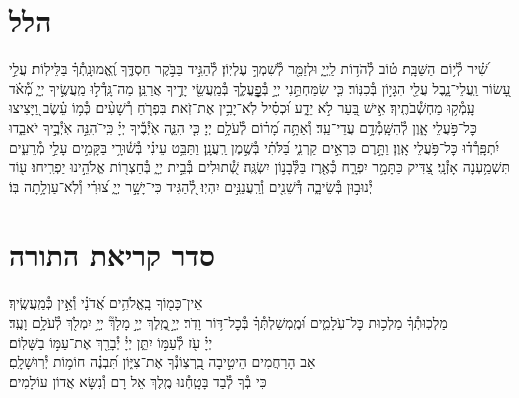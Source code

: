 \documentclass[twoside, openany, parskip=half, 11pt]{book}
\begin{document}
\label{hallel}
\section[הלל‎]{ הלל‎ }
\hallel{\shatz}


\vfill

\fullkaddish

\weekdayshir
\label{shirshabbat}

שִׁ֝֗יר לְ֯י֥וֹם הַשַּׁבָּֽת׃
ט֗וֹב לְ֯הֹד֥וֹת לַֽיְיָ֑ וּלְזַמֵּ֖ר לְ֯שִׁמְךָ֣ עֶלְיֽוֹן׃
לְ֯הַגִּ֣יד בַּבֹּ֣קֶר חַסְדֶּ֑ךָ וֶֽ֝אֱמוּנָֽתְ֯ךָ֗ בַּלֵּילֽוֹת׃
עֲלֵ֣י עָ֭שׂוֹר וַֽעֲלֵי־נָ֑בֶל עֲלֵ֖י הִגָּי֣וֹן בְּ֯כִנּֽוֹר׃
כִּ֤י שִׂמַּחְתַּ֣נִי יְיָ֣ בְּ֯פׇׇׇׇׇׇׇׇֽעֳלֶ֑ךָ בְּ֯מַֽעֲשֵׂ֖י יָדֶ֣יךָ אֲרַנֵּֽן׃
מַה־גָּֽדְ֯ל֣וּ מַֽעֲשֶׂ֣יךָ יְיָ֑ מְ֝֯אֹ֗ד עָֽמְ֯ק֥וּ מַחְשְׁ֯בֹתֶֽיךָ׃
אִ֣ישׁ בַּ֭עַר לֹ֣א יֵדָ֑ע וּ֝כְסִ֗יל לֹֽא־יָבִ֥ין אֶת־זֹֽאת׃
בִּפְרֹ֤חַ רְ֯שָׁעִ֨ים כְּ֯מ֥וֹ עֵ֗שֶׂב וַ֭יָּצִיצוּ כׇּל־פֹּ֣עֲלֵי אָ֑וֶן לְ֯הִשָּֽׁמְ֯דָ֥ם עֲדֵי־עַֽד׃
וְ֯אַתָּ֥ה מָ֝ר֗וֹם לְ֯עֹלָ֥ם יְיָ׃
כִּ֤י הִנֵּ֢ה אֹֽיְ֯בֶ֡יךָ יְיָ֗ כִּֽי־ֹהִנֵּ֣ה אֹֽיְ֯בֶ֣יךָ יֹאבֵ֑דוּ יִ֝תְפָּֽרְ֯ד֗וּ כׇּל־פֹּ֥עֲלֵי אָֽוֶן׃
וַתָּ֣רֶם כִּרְאֵ֣ים קַרְנִ֑י בַּ֝לֹּתִ֗י בְּ֯שֶׁ֣מֶן רַֽעֲנָֽן׃
וַתַּבֵּ֥ט עֵינִ֗י בְּ֯שׁ֫וּרָ֥י בַּקָּמִ֣ים עָלַ֣י מְ֯רֵעִ֑ים תִּשְׁמַ֥עְנָה אָזְ֯נָֽי׃
צַ֭דִּיק כַּתָּמָ֣ר יִפְרָ֑ח כְּ֯אֶ֖רֶז בַּלְּ֯בָנ֣וֹן יִשְׂגֶּֽה׃
שְׁ֭֯תוּלִים בְּ֯בֵ֣ית יְיָ֑ בְּ֯חַצְר֖וֹת אֱלֹהֵ֣ינוּ יַפְרִֽיחוּ׃
ע֖וֹד יְ֯נוּב֣וּן בְּ֯שֵׂיבָ֑ה דְּ֯שֵׁנִ֖ים וְ֯רַֽעֲנַנִּ֣ים יִהְיֽוּ׃
לְ֭֯הַגִּיד כִּי־יָשָׁ֣ר יְיָ֑ צ֝וּרִ֗י וְ֯לֹֽא־עַוְלָ֥תָה בּֽוֹ׃
\mournerskaddish



\nextpage

\section[סדר קריאת התורה]{ סדר קריאת התורה }

אֵין־כָּמ֖וֹךָ בָֽאֱלֹהִ֥ים אֲ֝דֹנָ֗י וְ֯אֵ֣ין כְּ֯מַֽעֲשֶֽׂיךָ׃
\\
מַלְכֽוּתְ֯ךָ֗ מַלְכ֥וּת כׇּל־עֹֽלָמִ֑ים וּ֝מֶֽמְשַׁלְתְּ֯ךָ֗ בְּ֯כׇל־דּ֥וֹר וָדֹֽר׃
יְיָ֣ ֖מֶֽלֶךְ
יְיָ֣ מָלָךְ֘
יְיָ֥ יִמְלֹ֖ךְ לְ֯עֹלָ֥ם וָעֶֽד׃
\\
יְיָ֗ עֹ֖ז לְ֯עַמּ֣וֹ יִתֵּ֑ן יְיָ֓ יְ֯בָרֵ֖ךְ אֶת־עַמּ֣וֹ בַשָּׁלֽוֹם׃
\\
אַב הָרַחֲמִים הֵיטִ֣יבָה בִֽ֭רְצֽוֹנְ֯ךָ אֶת־צִיּ֑וֹן תִּ֝בְנֶ֗ה חוֹמ֥וֹת יְ֯רֽוּשָׁלָֽםִ׃
\\
כִּי בְ֯ךָ לְ֯בַד בָּטָֽחְ֯נוּ מֶֽלֶךְ אֵל רָם וְ֯נִשָּׂא אֲדוֹן עוֹלָמִים׃
\end{document}

